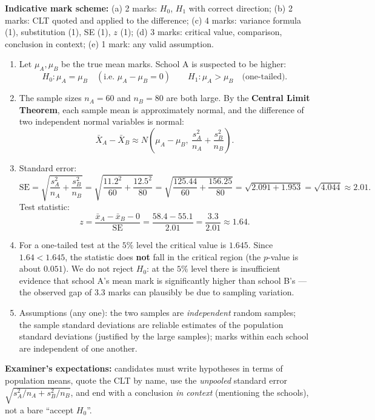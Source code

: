 \documentclass[11pt]{article}
\begin{document}
\begin{corrige}
\textbf{Indicative mark scheme:} (a) 2 marks: $H_0$, $H_1$ with correct direction; (b) 2 marks: CLT quoted and applied to the difference; (c) 4 marks: variance formula (1), substitution (1), SE (1), $z$ (1); (d) 3 marks: critical value, comparison, conclusion in context; (e) 1 mark: any valid assumption.
\begin{enumerate}
\item Let $\mu_A, \mu_B$ be the true mean marks. School A is suspected to be higher:
\[ H_0: \mu_A = \mu_B \quad (\text{i.e. } \mu_A - \mu_B = 0) \qquad H_1: \mu_A > \mu_B \quad \text{(one-tailed).} \]
\item The sample sizes $n_A = 60$ and $n_B = 80$ are both large. By the \textbf{Central Limit Theorem}, each sample mean is approximately normal, and the difference of two independent normal variables is normal:
\[ \bar{X}_A - \bar{X}_B \approx N\!\left(\mu_A - \mu_B,\ \frac{s_A^2}{n_A} + \frac{s_B^2}{n_B}\right). \]
\item Standard error:
\[ \text{SE} = \sqrt{\frac{s_A^2}{n_A} + \frac{s_B^2}{n_B}} = \sqrt{\frac{11.2^2}{60} + \frac{12.5^2}{80}} = \sqrt{\frac{125.44}{60} + \frac{156.25}{80}} = \sqrt{2.091 + 1.953} = \sqrt{4.044} \approx 2.01. \]
Test statistic:
\[ z = \frac{\bar{x}_A - \bar{x}_B - 0}{\text{SE}} = \frac{58.4 - 55.1}{2.01} = \frac{3.3}{2.01} \approx 1.64. \]
\item For a one-tailed test at the $5\%$ level the critical value is $1.645$. Since $1.64 < 1.645$, the statistic does \textbf{not} fall in the critical region (the $p$-value is about $0.051$). We do not reject $H_0$: at the $5\%$ level there is insufficient evidence that school A's mean mark is significantly higher than school B's — the observed gap of $3.3$ marks can plausibly be due to sampling variation.
\item Assumptions (any one): the two samples are \emph{independent} random samples; the sample standard deviations are reliable estimates of the population standard deviations (justified by the large samples); marks within each school are independent of one another.
\end{enumerate}
\textbf{Examiner's expectations:} candidates must write hypotheses in terms of population means, quote the CLT by name, use the \emph{unpooled} standard error $\sqrt{s_A^2/n_A + s_B^2/n_B}$, and end with a conclusion \emph{in context} (mentioning the schools), not a bare ``accept $H_0$''.
\end{corrige}
\end{document}
